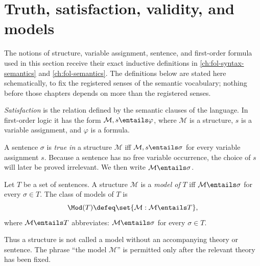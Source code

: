 \section{Truth, satisfaction, validity, and models}
\label{sec:levels-04}

The notions of structure, variable assignment, sentence, and first-order
formula used in this section receive their exact inductive definitions in
\cref{ch:fol-syntax-semantics} and \cref{ch:fol-semantics}.  The
definitions below are stated here schematically, to fix the registered
senses of the semantic vocabulary; nothing before those chapters depends on
more than the registered senses.

\begin{definition}[Satisfaction]
\emph{Satisfaction} is the relation defined by the semantic clauses of the
language.  In first-order logic it has the form
\(\mathcal M,s\entails\varphi\), where \(\mathcal M\) is a structure,
\(s\) is a variable assignment, and \(\varphi\) is a formula.
\end{definition}

\begin{definition}
A sentence \(\sigma\) is \emph{true in} a structure \(\mathcal M\) iff
\(\mathcal M,s\entails\sigma\) for every variable assignment \(s\).
Because a sentence has no free variable occurrence, the choice of \(s\) will
later be proved irrelevant.  We then write \(\mathcal M\entails\sigma\).
\end{definition}

\begin{definition}[Model]
Let \(T\) be a set of sentences.  A structure \(\mathcal M\) is a
\emph{model of} \(T\) iff \(\mathcal M\entails\sigma\) for every
\(\sigma\in T\).  The class of models of \(T\) is
\[
  \Mod(T)\defeq\set{\mathcal M: \mathcal M\entails T},
\]
where \(\mathcal M\entails T\) abbreviates: \(\mathcal M\entails\sigma\)
for every \(\sigma\in T\).
\end{definition}

Thus a structure is not called a model without an accompanying theory or
sentence.  The phrase ``the model \(\mathcal M\)'' is permitted only after the
relevant theory has been fixed.


